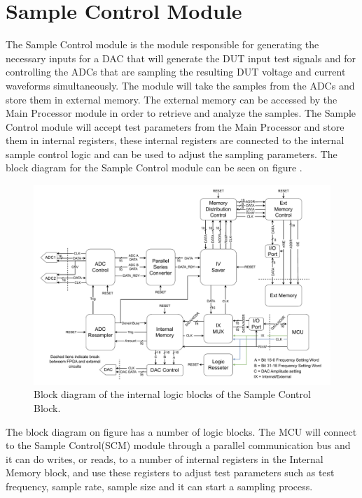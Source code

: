 \section{Sample Control Module} \label{sec:SampleControl}
The Sample Control module is the module responsible for generating the necessary inputs for a DAC that will generate the DUT input test signals and for controlling the ADCs that are sampling the resulting DUT voltage and current waveforms simultaneously. The module will take the samples from the ADCs and store them in external memory. The external memory can be accessed by the Main Processor module in order to retrieve and analyze the samples. The Sample Control module will accept test parameters from the Main Processor and store them in internal registers, these internal registers are connected to the internal sample control logic and can be used to adjust the sampling parameters. The block diagram for the Sample Control module can be seen on figure .
\begin{figure}[H]
    \centering
    \includegraphics[clip, trim=0 0 0 0, width=1\textwidth]{Sections/7_SystemDesign/Figures/Sample_Control_Block.pdf}
    \caption{Block diagram of the internal logic blocks of the Sample Control Block.}
    \label{fig:7_SampleControlBlock}
\end{figure}

The block diagram on figure  has a number of logic blocks. The MCU will connect to the Sample Control(SCM) module through a parallel communication bus and it can do writes, or reads, to a number of internal registers in the Internal Memory block, and use these registers to adjust test parameters such as test frequency, sample rate, sample size and it can start a sampling process. 

